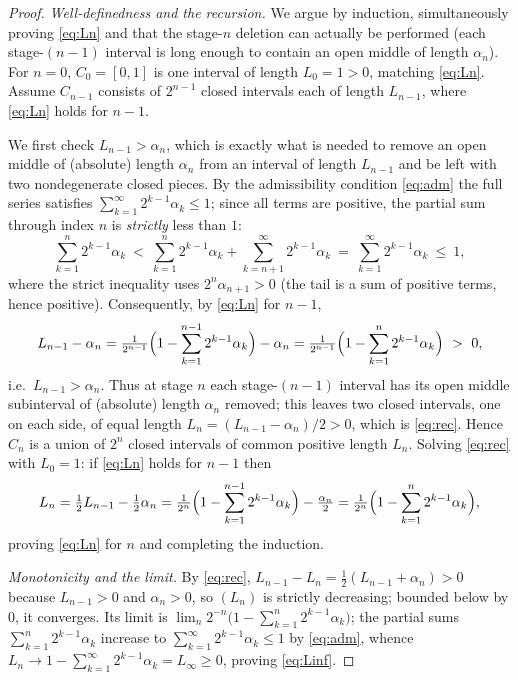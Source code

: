 \documentclass{amsart}
\theoremstyle{definition}
\theoremstyle{remark}
\begin{document}
\begin{proof}
\emph{Well-definedness and the recursion.}
We argue by induction, simultaneously proving \eqref{eq:Ln} and that the stage-$n$
deletion can actually be performed (each stage-$(n-1)$ interval is long enough to
contain an open middle of length $\alpha_n$). For $n=0$, $C_0=[0,1]$ is one
interval of length $L_0=1>0$, matching \eqref{eq:Ln}. Assume $C_{n-1}$ consists of
$2^{n-1}$ closed intervals each of length $L_{n-1}$, where \eqref{eq:Ln} holds for
$n-1$.

We first check $L_{n-1}>\alpha_n$, which is exactly what is needed to remove an open
middle of (absolute) length $\alpha_n$ from an interval of length $L_{n-1}$ and be
left with two nondegenerate closed pieces. By the admissibility condition
\eqref{eq:adm} the full series satisfies $\sum_{k=1}^{\infty}2^{k-1}\alpha_k\le1$;
since all terms are positive, the partial sum through index $n$ is \emph{strictly}
less than $1$:
\[
\sum_{k=1}^{n}2^{k-1}\alpha_k
\ <\ \sum_{k=1}^{n}2^{k-1}\alpha_k+\sum_{k=n+1}^{\infty}2^{k-1}\alpha_k
\ =\ \sum_{k=1}^{\infty}2^{k-1}\alpha_k\ \le\ 1,
\]
where the strict inequality uses $2^{n}\alpha_{n+1}>0$ (the tail is a sum of
positive terms, hence positive). Consequently, by \eqref{eq:Ln} for $n-1$,
\[
L_{n-1}-\alpha_n
=\tfrac1{2^{n-1}}\Bigl(1-\sum_{k=1}^{n-1}2^{k-1}\alpha_k\Bigr)-\alpha_n
=\tfrac1{2^{n-1}}\Bigl(1-\sum_{k=1}^{n}2^{k-1}\alpha_k\Bigr)\ >\ 0,
\]
i.e.\ $L_{n-1}>\alpha_n$. Thus at stage $n$ each stage-$(n-1)$ interval has its open
middle subinterval of (absolute) length $\alpha_n$ removed; this leaves two closed
intervals, one on each side, of equal length $L_n=(L_{n-1}-\alpha_n)/2>0$, which is
\eqref{eq:rec}. Hence $C_n$ is a union of $2^{n}$ closed intervals of common
positive length $L_n$. Solving \eqref{eq:rec} with $L_0=1$: if \eqref{eq:Ln} holds
for $n-1$ then
\[
L_n=\tfrac12 L_{n-1}-\tfrac12\alpha_n
=\tfrac{1}{2^{n}}\Bigl(1-\sum_{k=1}^{n-1}2^{k-1}\alpha_k\Bigr)-\tfrac{\alpha_n}{2}
=\tfrac{1}{2^{n}}\Bigl(1-\sum_{k=1}^{n}2^{k-1}\alpha_k\Bigr),
\]
proving \eqref{eq:Ln} for $n$ and completing the induction.

\smallskip
\emph{Monotonicity and the limit.}
By \eqref{eq:rec}, $L_{n-1}-L_n=\tfrac12(L_{n-1}+\alpha_n)>0$ because $L_{n-1}>0$ and
$\alpha_n>0$, so $(L_n)$ is strictly decreasing; bounded below by $0$, it converges.
Its limit is $\lim_n 2^{-n}\bigl(1-\sum_{k=1}^n 2^{k-1}\alpha_k\bigr)$; the partial
sums $\sum_{k=1}^n 2^{k-1}\alpha_k$ increase to $\sum_{k=1}^\infty
2^{k-1}\alpha_k\le1$ by \eqref{eq:adm}, whence
$L_n\to 1-\sum_{k=1}^{\infty}2^{k-1}\alpha_k=L_\infty\ge0$, proving \eqref{eq:Linf}.
\end{proof}
\end{document}
